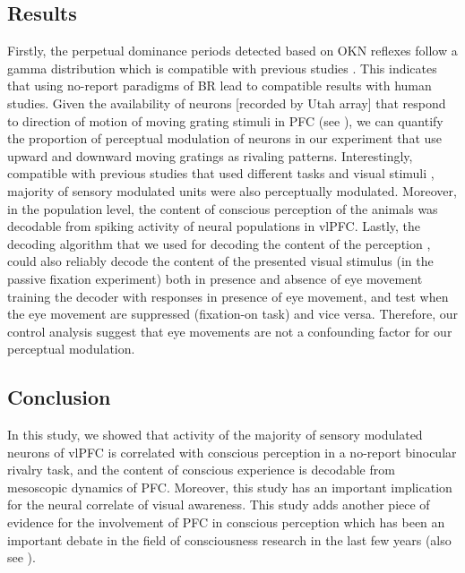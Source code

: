 \subsection*{Results}
Firstly, the perpetual dominance periods detected based on OKN reflexes follow a gamma distribution which is compatible with previous studies \cite{leveltNoteDistributionDominance1967}.
This indicates that using no-report paradigms of BR lead to compatible results with human studies.
Given the availability of neurons [recorded by Utah array] that respond to direction of motion of moving grating stimuli in PFC (see ),
we can quantify the proportion of perceptual modulation of neurons in our experiment that use upward and downward moving gratings as rivaling patterns. 
Interestingly, compatible with previous studies that used different tasks and visual stimuli \cite{panagiotaropoulosNeuronalDischargesGamma2012},
majority of sensory modulated units were also perceptually modulated.
Moreover, in the population level, the content of conscious perception of the animals was decodable from spiking activity of neural populations in vlPFC.
Lastly, the decoding algorithm that we used for decoding the content of the perception \cite{meyersNeuralDecodingToolbox2013},
could also reliably decode the content of the presented visual stimulus
(in the passive fixation experiment) both in presence and absence of eye movement
\ie training the decoder with responses in presence of eye movement,
and test when the eye movement are suppressed (fixation-on task) and vice versa.
Therefore, our control analysis suggest that
eye movements are not a confounding factor for our perceptual modulation.


\subsection*{Conclusion}
In this study, we showed that activity of the majority of sensory modulated neurons of vlPFC is correlated with conscious perception in a no-report binocular rivalry task,
and the content of conscious experience is decodable from mesoscopic dynamics of PFC.
Moreover, this study has an important implication for the neural correlate of visual awareness.
This study adds another piece of evidence for the involvement of PFC in conscious perception
which has been an important debate in the field of consciousness research in the last few years (also see ).




